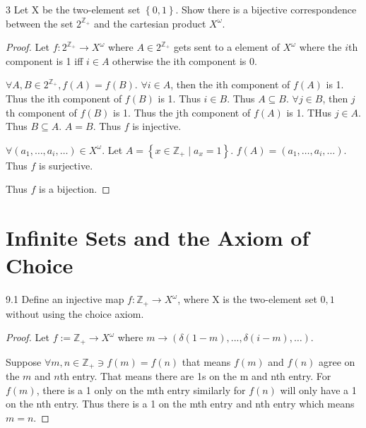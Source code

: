 \documentclass{article}
\newcommand{\Z}{\mathbb{Z}}
\begin{document}
\bigskip

\begin{PROB}{3}\label{Problem 3.}
    Let X be the two-element set $\left\{ 0, 1 \right\}$. Show there is a bijective correspondence between the set $2^{\Z_+}$ and the cartesian product $X^\omega$.
\end{PROB}
\begin{proof}
    Let $f : 2^{\Z_+} \to X^\omega$ where $A \in 2^{\Z_+}$ gets sent to a element of $X^\omega$  where the $i$th component is 1 iff $i \in A$ otherwise the ith component is 0.
    
    $\forall A, B \in 2^{\Z_+}, f(A) = f(B)$. $\forall i \in A$, then the ith component of $f(A)$ is 1. Thus the ith component of $f(B)$ is 1. Thus $i \in B$. Thus $A \subseteq B$. $\forall j \in B$, then $j$th component of $f(B)$ is 1. Thus the jth component of $f(A)$ is 1. THus $j \in A$. Thus $B \subseteq A$. $A = B$. Thus $f$ is injective. 
    
    $\forall (a_1, \dots, a_i, \dots) \in X^{\omega}$. Let $A = \left\{ x \in \Z_+ \mid a_x = 1 \right\}$. $f(A) = (a_1, \dots, a_i, \dots)$. Thus $f$ is surjective. 
    
    Thus $f$ is a bijection. 
\end{proof}

\section*{Infinite Sets and the Axiom of Choice}
\begin{PROB}{9.1}\label{Problem 9.1.}
    Define an injective map $f : \Z_+ \to X^\omega$, where X is the two-element set ${0,1}$ without using the choice axiom.
\end{PROB}
\begin{proof}
    Let $f := \Z_+ \to X^\omega$ where $m \to (\delta(1 - m), ..., \delta(i - m), \dots)$. 
    
    Suppose $\forall m, n \in \Z_+ \ni f(m) = f(n)$ that means $f(m)$ and $f(n)$ agree on the $m$ and $n$th entry. That means there are 1s on the m and nth entry. For $f(m)$, there is a 1 only on the mth entry similarly for $f(n)$ will only have a 1 on the nth entry. Thus there is a 1 on the mth entry and nth entry which means $m = n$.        
\end{proof}

\bigskip
\end{document}
